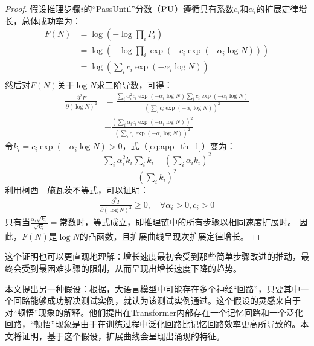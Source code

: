     
\begin{proof}
    假设推理步骤\(i\)的“PassUntil”分数（\(\textsc{PU}\)）遵循具有系数\(c_i\)和\(\alpha_i\)的扩展定律增长，总体成功率为：
    \begin{equation}
    \begin{split}
     F(N) & = \operatorname{log}\left(-\operatorname{log}\prod_i P_i\right)\\ & = \operatorname{log}\left(-\operatorname{log} \prod_i\operatorname{exp}\left(- c_i \operatorname{exp}(-\alpha_i \operatorname{log} N)\right)\right) \\ & = \operatorname{log}\left(\sum_i c_i \operatorname{exp}\left(-\alpha_i \operatorname{log} N \right)\right)\\
    \end{split}
    \end{equation}
    然后对\(F(N)\)关于\(\log N\)求二阶导数，可得：
    \begin{equation}
    \label{eq:app_th_1}
    \begin{split}
        \frac{\partial^2{F}}{\partial{(\operatorname{log}N )^2}} & = \frac{\sum_i \alpha_i^2 c_i \exp(-\alpha_i \log N) \sum_i c_i \exp(-\alpha_i \log N)}{(\sum_i c_i\exp(-\alpha_i \log N))^2} \\
    & - \frac{(\sum_i \alpha_i c_i \exp(-\alpha_i \log N) )^2}{(\sum_i c_i\exp(-\alpha_i \log N))^2}
    \end{split}
    \end{equation}
    令\(k_i = c_i \exp(-\alpha_i \log N) > 0\)，式（\ref{eq:app_th_1}）变为：
    \begin{equation}
    \frac{\sum_i \alpha_i^2 k_i\sum_i k_i - (\sum_i \alpha_i k_i)^2}{(\sum_i k_i)^2}
    \end{equation}
    利用柯西 - 施瓦茨不等式，可以证明：
    \begin{align}
    \frac{\partial^2{F}}{\partial{(\operatorname{log}N )^2}} \geq 0, \quad \forall  \alpha_i > 0, c_i > 0
    \end{align}
    只有当\(\frac{\alpha_i \sqrt{k_i}}{\sqrt{k_i}} = \text{常数}\)时，等式成立，即推理链中的所有步骤以相同速度扩展时。
    因此，\(F(N)\)是\(\operatorname{log}N\)的凸函数，且扩展曲线呈现次扩展定律增长。 
\end{proof}


这个证明也可以更直观地理解：增长速度最初会受到那些简单步骤改进的推动，最终会受到最困难步骤的限制，从而呈现出增长速度下降的趋势。

本文提出另一种假设：根据\citet{elhage2021mathematical}，大语言模型中可能存在多个神经“回路”，只要其中一个回路能够成功解决测试实例，就认为该测试实例通过。这个假设的灵感来自于\cite{varma2023explaining}对“顿悟”现象的解释。他们提出在Transformer内部存在一个记忆回路和一个泛化回路，“顿悟”现象是由于在训练过程中泛化回路比记忆回路效率更高所导致的。本文将证明，基于这个假设，扩展曲线会呈现出涌现的特征。

